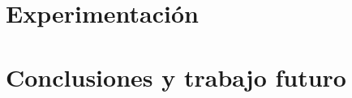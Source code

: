 \documentclass{report}
\renewcommand\_{\textunderscore\allowbreak}
\begin{document}


\chapter{Experimentación}\label{cha:exp}
\hfuzz=10pt 
\minitoc
\hfuzz=0pt 



\chapter{Conclusiones y trabajo futuro}\label{cha:concl}
\hfuzz=10pt 
\minitoc
\hfuzz=0pt 



\begin{appendices}

\end{appendices}



\end{document}
